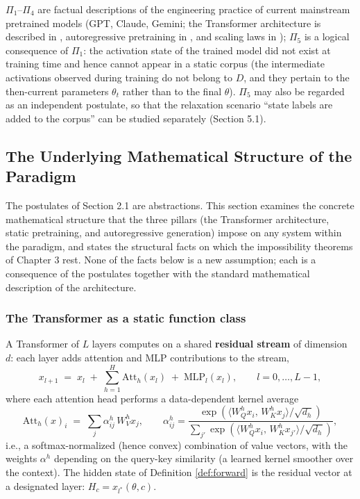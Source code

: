 \begin{remark}
$\Pi_1$--$\Pi_4$ are factual descriptions of the engineering practice of current mainstream
pretrained models (GPT, Claude, Gemini; the Transformer architecture is described in
\cite{vaswani-2017-attention}, autoregressive pretraining in \cite{brown-2020-gpt3}, and
scaling laws in \cite{kaplan-2020-scaling, hoffmann-2022-chinchilla}); $\Pi_5$ is a logical
consequence of $\Pi_1$: the activation state of the trained model did not exist at training
time and hence cannot appear in a static corpus (the intermediate activations observed during
training do not belong to $D$, and they pertain to the then-current parameters $\theta_t$
rather than to the final $\theta$). $\Pi_5$ may also be regarded as an independent postulate,
so that the relaxation scenario ``state labels are added to the corpus'' can be studied
separately (Section 5.1).
\end{remark}

\subsection{The Underlying Mathematical Structure of the Paradigm}

The postulates of Section 2.1 are abstractions. This section examines the concrete
mathematical structure that the three pillars (the Transformer architecture, static
pretraining, and autoregressive generation) impose on any system within the paradigm, and
states the structural facts on which the impossibility theorems of Chapter 3 rest. None of
the facts below is a new assumption; each is a consequence of the postulates together with
the standard mathematical description of the architecture.

\subsubsection{The Transformer as a static function class}

A Transformer of $L$ layers computes on a shared \textbf{residual stream} of dimension
$d$: each layer adds attention and MLP contributions to the stream,
\begin{equation}
x_{l+1} \;=\; x_l \;+\; \sum_{h=1}^{H} \mathrm{Att}_h(x_l) \;+\; \mathrm{MLP}_l(x_l),
\qquad l = 0, \dots, L-1 ,
\label{eq:residual}
\end{equation}
where each attention head performs a data-dependent kernel average
\begin{equation}
\mathrm{Att}_h(x)_i \;=\; \sum_{j} \alpha_{ij}^{h}\, W_V^{h} x_j,
\qquad \alpha_{ij}^{h} = \frac{\exp\!\left( \langle W_Q^{h} x_i,\, W_K^{h} x_j \rangle / \sqrt{d_h} \right)}
{\sum_{j'} \exp\!\left( \langle W_Q^{h} x_i,\, W_K^{h} x_{j'} \rangle / \sqrt{d_h} \right)},
\label{eq:attention}
\end{equation}
i.e., a softmax-normalized (hence convex) combination of value vectors, with the weights
$\alpha^{h}$ depending on the query-key similarity (a learned kernel smoother over the
context)\cite{elhage-2021-circuits, vaswani-2017-attention}. The hidden state of Definition
\ref{def:forward} is the residual vector at a designated layer: $H_c = x_{l^{*}}(\theta, c)$.

